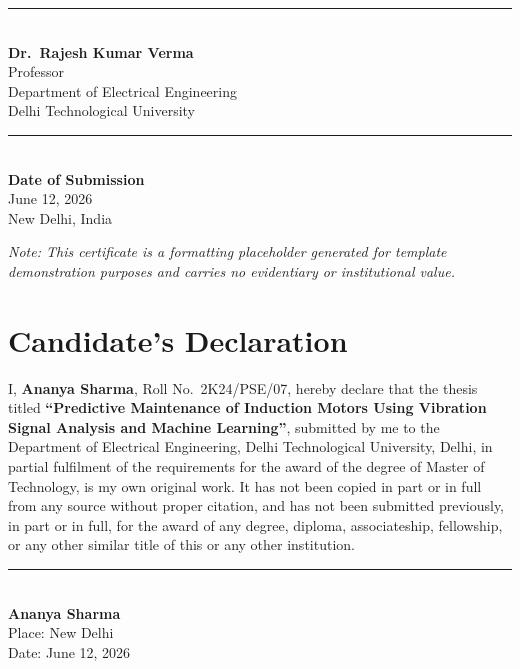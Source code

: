 \documentclass[12pt,a4paper]{report}
\begin{document}
\vspace{2cm}
\begin{minipage}[t]{0.45\textwidth}
\raggedright
\rule{5cm}{0.4pt}\\
\textbf{Dr.\ Rajesh Kumar Verma}\\
Professor\\
Department of Electrical Engineering\\
Delhi Technological University
\end{minipage}
\hfill
\begin{minipage}[t]{0.45\textwidth}
\raggedleft
\rule{5cm}{0.4pt}\\
\textbf{Date of Submission}\\
June 12, 2026\\
New Delhi, India
\end{minipage}

\vspace{1.3cm}
\noindent\textit{Note: This certificate is a formatting placeholder generated for template
demonstration purposes and carries no evidentiary or institutional value.}

\chapter*{Candidate's Declaration}

I, \textbf{Ananya Sharma}, Roll No.\ 2K24/PSE/07, hereby declare that the thesis titled
\textbf{``Predictive Maintenance of Induction Motors Using Vibration Signal Analysis and Machine
Learning''}, submitted by me to the Department of Electrical Engineering, Delhi Technological
University, Delhi, in partial fulfilment of the requirements for the award of the degree of
Master of Technology, is my own original work. It has not been copied in part or in full from
any source without proper citation, and has not been submitted previously, in part or in full,
for the award of any degree, diploma, associateship, fellowship, or any other similar title of
this or any other institution.

\vspace{2cm}
\begin{flushright}
\rule{5cm}{0.4pt}\\
\textbf{Ananya Sharma}\\
Place: New Delhi\\
Date: June 12, 2026
\end{flushright}
\end{document}
